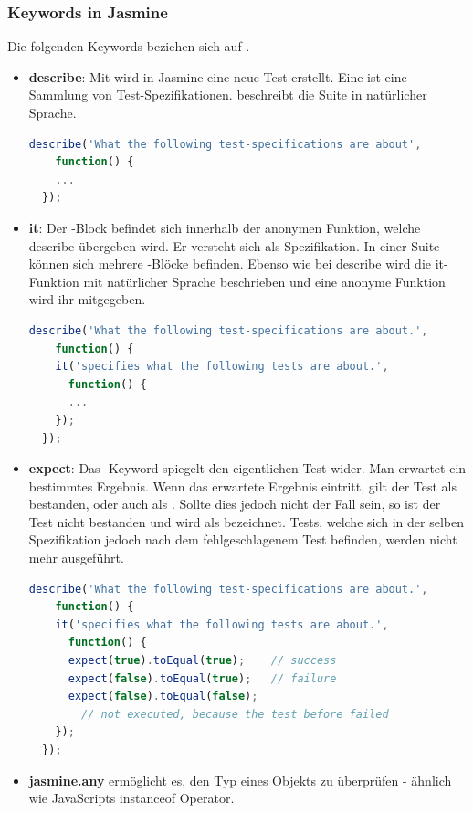 \subsubsection{Keywords in Jasmine}
Die folgenden Keywords beziehen sich auf \cite[5-8]{Hahn:2013}.
\begin{itemize}
  \item \textbf{describe}:\newline
        Mit  wird in Jasmine eine neue Test  erstellt. Eine  ist eine Sammlung von Test-Spezifikationen.  beschreibt die Suite in natürlicher Sprache.
\begin{lstlisting}[language=JavaScript]
  describe('What the following test-specifications are about',
    function() {
    ...
  });
\end{lstlisting}
  \item \textbf{it}:\newline
        Der -Block befindet sich innerhalb der anonymen Funktion, welche describe übergeben wird. Er versteht sich als Spezifikation. In einer Suite können sich mehrere -Blöcke befinden. Ebenso wie bei describe wird die it-Funktion mit natürlicher Sprache beschrieben und eine anonyme Funktion wird ihr mitgegeben.
\begin{lstlisting}[language=JavaScript]
  describe('What the following test-specifications are about.',
    function() {
    it('specifies what the following tests are about.',
      function() {
      ...
    });
  });
\end{lstlisting}
  \item \textbf{expect}:\newline
        Das -Keyword spiegelt den eigentlichen Test wider. Man erwartet ein bestimmtes Ergebnis. Wenn das erwartete Ergebnis eintritt, gilt der Test als bestanden, oder auch als . Sollte dies jedoch nicht der Fall sein, so ist der Test nicht bestanden und wird als  bezeichnet. Tests, welche sich in der selben Spezifikation jedoch nach dem fehlgeschlagenem Test befinden, werden nicht mehr ausgeführt.
\begin{lstlisting}[language=JavaScript]
  describe('What the following test-specifications are about.',
    function() {
    it('specifies what the following tests are about.',
      function() {
      expect(true).toEqual(true);    // success
      expect(false).toEqual(true);   // failure
      expect(false).toEqual(false);
        // not executed, because the test before failed
    });
  });
\end{lstlisting}

\item \textbf{jasmine.any} ermöglicht es, den Typ eines Objekts zu überprüfen - ähnlich wie JavaScripts instanceof Operator.

\end{itemize}

